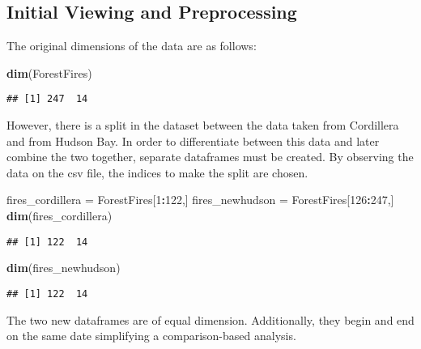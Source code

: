 \documentclass[
]{article}
\newenvironment{Shaded}{\begin{snugshade}}{\end{snugshade}}
\newcommand{\DecValTok}[1]{\textcolor[rgb]{0.00,0.00,0.81}{#1}}
\newcommand{\FunctionTok}[1]{\textcolor[rgb]{0.13,0.29,0.53}{\textbf{#1}}}
\newcommand{\NormalTok}[1]{#1}
\newcommand{\OtherTok}[1]{\textcolor[rgb]{0.56,0.35,0.01}{#1}}
\newcommand{\SpecialCharTok}[1]{\textcolor[rgb]{0.81,0.36,0.00}{\textbf{#1}}}
\begin{document}
\subsection{Initial Viewing and
Preprocessing}\label{initial-viewing-and-preprocessing}

The original dimensions of the data are as follows:

\begin{Shaded}
\begin{Highlighting}[]
\FunctionTok{dim}\NormalTok{(ForestFires)}
\end{Highlighting}
\end{Shaded}

\begin{verbatim}
## [1] 247  14
\end{verbatim}

However, there is a split in the dataset between the data taken from
Cordillera and from Hudson Bay. In order to differentiate between this
data and later combine the two together, separate dataframes must be
created. By observing the data on the csv file, the indices to make the
split are chosen.

\begin{Shaded}
\begin{Highlighting}[]
\NormalTok{fires\_cordillera }\OtherTok{=}\NormalTok{ ForestFires[}\DecValTok{1}\SpecialCharTok{:}\DecValTok{122}\NormalTok{,]}
\NormalTok{fires\_newhudson }\OtherTok{=}\NormalTok{ ForestFires[}\DecValTok{126}\SpecialCharTok{:}\DecValTok{247}\NormalTok{,]}
\FunctionTok{dim}\NormalTok{(fires\_cordillera)}
\end{Highlighting}
\end{Shaded}

\begin{verbatim}
## [1] 122  14
\end{verbatim}

\begin{Shaded}
\begin{Highlighting}[]
\FunctionTok{dim}\NormalTok{(fires\_newhudson)}
\end{Highlighting}
\end{Shaded}

\begin{verbatim}
## [1] 122  14
\end{verbatim}

The two new dataframes are of equal dimension. Additionally, they begin
and end on the same date simplifying a comparison-based analysis.
\end{document}
